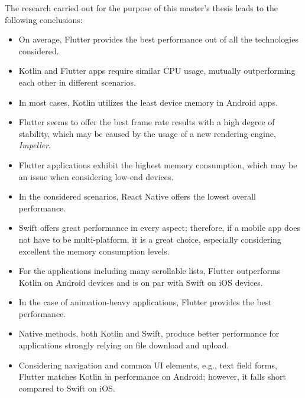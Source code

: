 The research carried out for the purpose of this master's thesis leads to the following conclusions:

\begin{itemize}[nosep]
    \item On average, Flutter provides the best performance out of all the technologies considered.
    \item Kotlin and Flutter apps require similar CPU usage, mutually outperforming each other in different scenarios.
    \item In most cases, Kotlin utilizes the least device memory in Android apps.
    \item Flutter seems to offer the best frame rate results with a high degree of stability, which may be caused by the usage of a new rendering engine, \emph{Impeller}.
    \item Flutter applications exhibit the highest memory consumption, which may be an issue when considering low-end devices.
    \item In the considered scenarios, React Native offers the lowest overall performance.
    \item Swift offers great performance in every aspect; therefore, if a mobile app does not have to be multi-platform, it is a great choice, especially considering excellent the memory consumption levels.
    \item For the applications including many scrollable lists, Flutter outperforms Kotlin on Android devices and is on par with Swift on iOS devices.
    \item In the case of animation-heavy applications, Flutter provides the best performance.
    \item Native methods, both Kotlin and Swift, produce better performance for applications strongly relying on file download and upload.
    \item Considering navigation and common UI elements, e.g., text field forms, Flutter matches Kotlin in performance on Android; however, it falls short compared to Swift on iOS.
\end{itemize}

\clearpage
